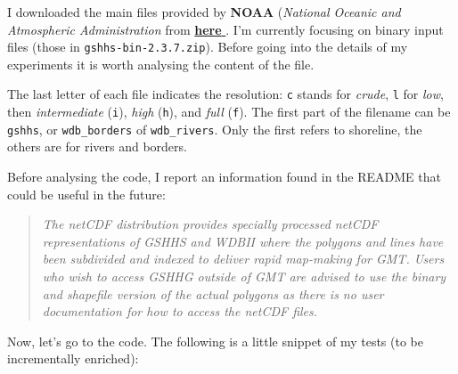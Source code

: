 I downloaded the main files provided by \textbf{NOAA} (\textit{National Oceanic and Atmospheric Administration} from \href{https://www.ngdc.noaa.gov/mgg/shorelines/data/gshhg/latest/}{\textbf{here \faExternalLink}}. I'm currently focusing on binary input files (those in \texttt{gshhs-bin-2.3.7.zip}). Before going into the details of my experiments it is worth analysing the content of the file.

The last letter of each file indicates the resolution: \texttt{c} stands for \textit{crude}, \texttt{l} for \textit{low}, then \textit{intermediate} (\texttt{i}), \textit{high} (\texttt{h}), and \textit{full} (\texttt{f}). The first part of the filename can be \texttt{gshhs}, or \texttt{wdb\_borders} of \texttt{wdb\_rivers}. Only the first refers to shoreline, the others are for rivers and borders.

Before analysing the code, I report an information found in the README that could be useful in the future:

\begin{quote}
\textit{The netCDF distribution provides specially processed netCDF representations of GSHHS and WDBII where the polygons and lines have been subdivided and indexed to deliver rapid map-making for GMT.  Users who wish to access GSHHG outside of GMT are advised to use the binary and shapefile version of the actual polygons as there is no user documentation for how to access the netCDF files.}
\end{quote}

Now, let's go to the code. The following is a little snippet of my tests (to be incrementally enriched):

